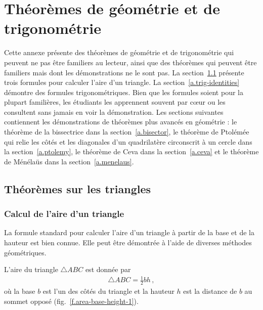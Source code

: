 \chapter{Théorèmes de géométrie et de trigonométrie}\label{a.trig}



Cette annexe présente des théorèmes de géométrie et de trigonométrie qui peuvent ne pas être familiers au lecteur, ainsi que des théorèmes qui peuvent être familiers mais dont les démonstrations ne le sont pas. La section~\ref{a.triangles} présente trois formules pour calculer l'aire d'un triangle. La section~\ref{a.trig-identities} démontre des formules trigonométriques. Bien que les formules soient pour la plupart familières, les étudiants les apprennent souvent par cœur ou les consultent sans jamais en voir la démonstration. Les sections suivantes contiennent les démonstrations de théorèmes plus avancés en géométrie :  le théorème de la bissectrice dans la section~\ref{a.bisector}, le théorème de Ptolémée qui relie les côtés et les diagonales d'un quadrilatère circonscrit à un cercle dans  la  section~\ref{a.ptolemy}, le théorème de Ceva dans la  section~\ref{a.ceva} et le théorème de Ménélaüs  dans la section~\ref{a.menelaus}.


\section{Théorèmes sur les triangles}\label{a.triangles}


\subsection{Calcul de l'aire d'un triangle}


La formule standard pour calculer l'aire d'un triangle à partir de la base et de la hauteur est bien connue. Elle peut être démontrée à l'aide de diverses méthodes géométriques.

\begin{theorem} L'aire du triangle $\triangle ABC$ est donnée par 
\begin{align}
\triangle ABC=\frac{1}{2}bh\,,\label{eq.area-from-base}
\end{align}
où la base $b$ est l'un des côtés du triangle  et la hauteur $h$ est la distance de $b$ au sommet opposé (fig.~\ref{f.area-base-height-1}).
\end{theorem}

